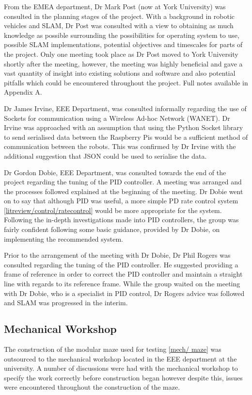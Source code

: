 From the EMEA department, Dr Mark Post (now at York University) 
was consulted in the planning stages of the project. With a 
background in robotic vehicles and SLAM, Dr Post was consulted 
with a view to obtaining as much knowledge as possible 
surrounding the possibilities for operating system to use, 
possible SLAM implementations, potential objectives and 
timescales for parts of the project. Only one meeting took place 
as Dr Post moved to York University shortly after the meeting, 
however, the meeting was highly beneficial and gave a vast 
quantity of insight into existing solutions and software and 
also potential pitfalls which could be encountered throughout 
the project. Full notes available in Appendix A. 

Dr James Irvine, EEE Department, was consulted informally  
regarding the use of Sockets for communication using a Wireless 
Ad-hoc Network (WANET). Dr Irvine was approached with an 
assumption that using the Python Socket library to send 
serialised data between the Raspberry Pis would be a sufficient 
method of communication between the robots. This was confirmed 
by Dr Irvine with the additional suggestion that JSON could be 
used to serialise the data. 


Dr Gordon Dobie, EEE Department, was consulted towards the end 
of the project regarding the tuning of the PID controller. A 
meeting was arranged and the processes followed explained at the 
beginning of the meeting. Dr Dobie went on to say that although 
PID was useful, a more simple PD rate control system 
\ref{litreview/control/ratecontrol} would be more appropriate 
for the system. Following the in-depth investigations made into 
PID controllers, the group was fairly confident following some 
basic guidance, provided by Dr Dobie, on implementing the 
recommended system. 


Prior to the arrangement of the meeting with Dr Dobie, Dr Phil 
Rogers was consulted regarding the tuning of the PID controller. 
He suggested providing a frame of reference in order to correct 
the PID controller and maintain a straight line with regards to its reference frame. While the group waited on the meeting with Dr Dobie, who is a specialist in PID control, Dr Rogers advice was followed and SLAM was progressed in the interim.   

\subsection{Mechanical Workshop}\label{pm/mechshop}
The construction of the modular maze used for testing \ref{mech/
maze} was outsourced to the mechanical workshop located in the 
EEE department at the university. A number of discussions were 
had with the mechanical workshop to specify the work correctly 
before construction began however despite this, issues were 
encountered throughout the construction of the maze. 

